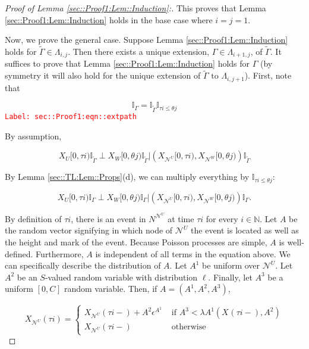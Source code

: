 \documentclass[12pt]{article}
\newcommand{\mb}{\mathbb}
\newcommand{\mc}{\mathcal}
\newcommand{\te}{\text}
\newcommand{\ep}{\epsilon}
\newcommand{\tr}{\textcolor{red}}
\newcommand{\labe}[1]{\tr{\texttt{Label: #1}}}
\newcommand{\ind}{\hspace{24pt}}
\renewcommand{\U}{U}							%
\newcommand{\UU}{W}								%
\renewcommand{\S}{S}							%
\newcommand{\ev}{\ep}							%
\newcommand{\X}{X}								%
\newcommand{\neigh}{\mc{N}}						%
\newcommand{\vind}[1]{^{#1}}					%
\newcommand{\cind}[1]{_{#1}}					%
\newcommand{\tp}[1]{(#1)}						%
\newcommand{\tip}[1]{#1}						%
\newcommand{\const}{C}							%
\newcommand{\poiss}{N}							%
\newcommand{\Sm}{\ell}							%
\newcommand{\rate}{\lambda}						%
\newcommand{\alt}[1]{\widetilde{#1}}			%
\newcommand{\indx}[1]{_{#1}}					%
\newcommand{\rt}{\tau}							%
\newcommand{\rtt}{\theta}						%
\newcommand{\apath}{\Gamma}						%
\newcommand{\pathset}[2]{\Lambda_{#1,#2}}		%
\newcommand{\rv}{A}								%
\begin{document}
\begin{proof}[Proof of Lemma \ref{sec::Proof1:Lem::Induction}:]
This proves that Lemma \ref{sec::Proof1:Lem::Induction} holds in the base case where \(i = j = 1\).

\ind Now, we prove the general case. Suppose Lemma \ref{sec::Proof1:Lem::Induction} holds for \(\alt{\apath{}} \in \pathset{i}{j}\). Then there exists a unique extension, \(\apath{} \in \pathset{i+1}{j}\), of \(\alt{\apath{}}\). It suffices to prove that Lemma \ref{sec::Proof1:Lem::Induction} holds for \(\apath{}\) (by symmetry it will also hold for the unique extension of \(\alt{\apath{}} \te{ to } \pathset{i}{j+1}\)). First, note that

\begin{equation}
\mb{I}_{\apath{}} = \mb{I}_{\alt{\apath{}}}\mb{I}_{\rt{i} \leq \rtt{j}}
\label{sec::Proof1:eqn::extpath}
\end{equation}
\labe{sec::Proof1:eqn::extpath}

By assumption,

\[\X\cind{\U}\tip{[0,\rt{i})}\mb{I}_{\alt{\apath{}}}\perp \X\cind{\UU}\tip{[0,\rtt{j})}\mb{I}_{\alt{\apath{}}}|\left(\X\cind{\neigh\vind{\U}}\tip{[0,\rt{i})},\X\cind{\neigh\vind{\UU}}\tip{[0,\rtt{j})}\right)\mb{I}_{\alt{\apath{}}}\]

By Lemma \ref{sec::TL:Lem::Props}(d), we can multiply everything by \(\mb{I}_{\rt{i} \leq \rtt{j}}\):

\[\X\cind{\U}\tip{[0,\rt{i})}\mb{I}_{\apath{}}\perp \X\cind{\UU}\tip{[0,\rtt{j})}\mb{I}_{\apath{}}|\left(\X\cind{\neigh\vind{\U}}\tip{[0,\rt{i})},\X\cind{\neigh\vind{\UU}}\tip{[0,\rtt{j})}\right)\mb{I}_{\apath{}}.\]

By definition of \(\rt{i}\), there is an event in \(\poiss\vind{\neigh\vind{\U}}\) at time \(\rt{i}\) for every \(i \in \mb{ N}\). Let \(\rv\) be the random vector signifying in which node of \(\neigh\vind{\U}\) the event is located as well as the height and mark of the event. Because Poisson processes are simple, \(\rv\) is well-defined. Furthermore, \(\rv\) is independent of all terms in the equation above. We can specifically describe the distribution of \(\rv\). Let \(\rv^1\) be uniform over \(\neigh\vind{\U}\). Let \(\rv^2\) be an \(\S\)-valued random variable with distribution \(\Sm\). Finally, let \(\rv^3\) be a uniform \([0,\const\indx{}]\) random variable. Then, if \(\rv=(\rv^1,\rv^2,\rv^3)\),

\[\X\cind{\neigh\vind{\U}}\tp{\rt{i}} = \begin{cases}
\X\cind{\neigh\vind{\U}}\tp{\rt{i}-} + \rv^2\ev\vind{\rv^1} &\te{ if } \rv^3< \rate{\rv^1}(\X\cind{}\tp{\rt{i}-}, \rv^2)\\
\X\cind{\neigh\vind{\U}}\tp{\rt{i}-} &\te{ otherwise}
\end{cases}\]


\end{proof}
\end{document}
